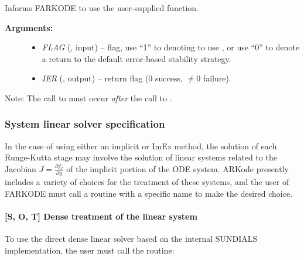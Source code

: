 \documentclass[letterpaper,10pt,english]{sphinxmanual}
\begin{document}
\begin{fulllineitems}
\label{f_interface/Usage:f/_/FARKEXPSTABSET}
Informs FARKODE to use the user-supplied {\hyperref[f_interface/Usage:f/_/FARKEXPSTAB]{\emph{}}} function.
\begin{description}
\item[{\textbf{Arguments:}}] \leavevmode\begin{itemize}
\item {} 
\emph{FLAG} (, input) -- flag, use ``1'' to denoting to use
{\hyperref[f_interface/Usage:f/_/FARKEXPSTAB]{\emph{}}}, or use ``0'' to denote a return to the
default error-based stability strategy.

\item {} 
\emph{IER} (, output) -- return flag (0 success, \(\ne
0\) failure).

\end{itemize}

\end{description}

Note: The call to {\hyperref[f_interface/Usage:f/_/FARKEXPSTABSET]{\emph{}}} must occur \emph{after} the call
to {\hyperref[f_interface/Usage:f/_/FARKMALLOC]{\emph{}}}.

\end{fulllineitems}



\subsubsection{System linear solver specification}
\label{f_interface/Usage:system-linear-solver-specification}\label{f_interface/Usage:finterface-linearsolver}
In the case of using either an implicit or ImEx method, the solution
of each Runge-Kutta stage may involve the solution of linear systems
related to the Jacobian \(J = \frac{\partial f_I}{\partial y}\) of
the implicit portion of the ODE system. ARKode presently includes
a variety of choices for the treatment of these systems, and the user
of FARKODE must call a routine with a specific name to make the
desired choice.


\paragraph{{[}\textbf{S}, \textbf{O}, \textbf{T}{]} Dense treatment of the linear system}
\label{f_interface/Usage:s-o-t-dense-treatment-of-the-linear-system}
To use the direct dense linear solver based on the internal SUNDIALS
implementation, the user must call the {\hyperref[f_interface/Usage:f/_/FARKDENSE]{\emph{}}} routine:
\end{document}
